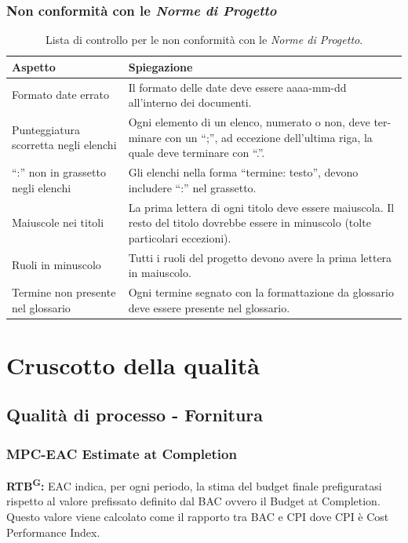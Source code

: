 \documentclass[8pt]{article}
\newcommand{\glossterm}[1]{#1\textsuperscript{G}} %
\begin{document}
\subsubsection{Non conformità con le \textit{Norme di Progetto}}
\renewcommand{\arraystretch}{2.5}
\begin{longtable}{|>{\centering}p{5cm}|>{\centering\arraybackslash}p{10cm}|}
\hline
\rowcolor{white}
    \textbf{Aspetto} & \textbf{Spiegazione} \\
\hline
\endfirsthead
\rowcolor{white}
    \caption{Lista di controllo per le non conformità con le \textit {Norme di Progetto}.}
    \label{table: Lista di controllo per le non conformità con le Norme di Progetto}
\endlastfoot
    Formato date errato & Il formato delle date deve essere aaaa-mm-dd all’interno dei documenti. \\
    \hline
    Punteggiatura scorretta negli elenchi &  Ogni elemento di un elenco, numerato o non, deve ter-
    minare con un ``;”, ad eccezione dell’ultima riga, la quale deve terminare con ``.”. \\ 
    \hline
    ``:” non in grassetto negli elenchi & Gli elenchi nella forma ``termine: testo”, devono
    includere ``:” nel grassetto. \\
    \hline
    Maiuscole nei titoli & La prima lettera di ogni titolo deve essere maiuscola. Il resto del
    titolo dovrebbe essere in minuscolo (tolte particolari eccezioni). \\
    \hline
    Ruoli in minuscolo & Tutti i ruoli del progetto devono avere la prima lettera in maiuscolo. \\
    \hline
    Termine non presente nel glossario & Ogni termine segnato con la formattazione da glossario deve essere presente nel glossario. \\
\hline
\end{longtable}
\newpage
\section{Cruscotto della qualità}
\subsection{Qualità di processo - Fornitura}
\subsubsection{MPC-EAC Estimate at Completion}
\textbf{\glossterm{RTB}:} EAC indica, per ogni periodo, la stima del budget finale prefiguratasi rispetto al valore prefissato definito dal BAC ovvero il Budget at Completion. Questo valore viene calcolato come il rapporto tra BAC e CPI dove CPI è Cost Performance Index.
\end{document}

